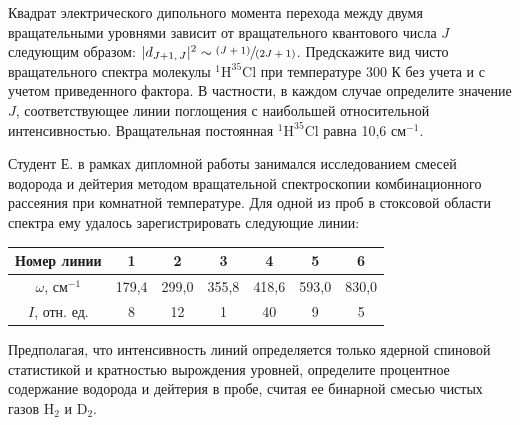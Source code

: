  Квадрат электрического дипольного момента перехода между двумя вращательными уровнями зависит от вращательного квантового числа $J$ следующим образом: $|d_{J+1,\,J}|^2 \sim \sfrac{(J+1)}{(2J+1)}$. Предскажите вид чисто вращательного спектра молекулы $^{1}\text{H}^{35}\text{Cl}$ при температуре 300 К без учета и с учетом приведенного фактора. В частности, в каждом случае определите значение $J$, соответствующее линии поглощения с наибольшей относительной интенсивностью. Вращательная постоянная $^{1}\text{H}^{35}\text{Cl}$ равна 10,6 см$^{-1}$.
\par
{} Студент Е. в рамках дипломной работы занимался исследованием смесей водорода и дейтерия методом вращательной спектроскопии комбинационного рассеяния при комнатной температуре. Для одной из проб в стоксовой области спектра ему удалось зарегистрировать следующие линии:
\begin{center}
\begin{tabular}{ c c c c c c c }

 Номер линии & 1 & 2 & 3 & 4 & 5 & 6 \\
 \hline
 $\omega$, см$^{-1}$ & 179,4 & 299,0 & 355,8 & 418,6 & 593,0 & 830,0 \\
 $I$, отн. ед. & 8 & 12 & 1 & 40 & 9 & 5
\end{tabular}
\end{center}
Предполагая, что интенсивность линий определяется только ядерной спиновой статистикой и кратностью вырождения уровней, определите процентное содержание водорода и дейтерия в пробе, считая ее бинарной смесью чистых газов $\text{H}_{2}$ и $\text{D}_{2}$.
\par